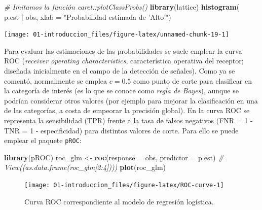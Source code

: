 \documentclass[]{book}
\newenvironment{Shaded}{\begin{snugshade}}{\end{snugshade}}
\newcommand{\KeywordTok}[1]{\textcolor[rgb]{0.13,0.29,0.53}{\textbf{#1}}}
\newcommand{\DataTypeTok}[1]{\textcolor[rgb]{0.13,0.29,0.53}{#1}}
\newcommand{\StringTok}[1]{\textcolor[rgb]{0.31,0.60,0.02}{#1}}
\newcommand{\CommentTok}[1]{\textcolor[rgb]{0.56,0.35,0.01}{\textit{#1}}}
\newcommand{\OperatorTok}[1]{\textcolor[rgb]{0.81,0.36,0.00}{\textbf{#1}}}
\newcommand{\NormalTok}[1]{#1}
\theoremstyle{break}
\theoremstyle{definition}
\theoremstyle{definition}
\theoremstyle{definition}
\theoremstyle{remark}
\begin{document}
\begin{Shaded}
\begin{Highlighting}[]
\CommentTok{# Imitamos la función caret::plotClassProbs()}
\KeywordTok{library}\NormalTok{(lattice) }
\KeywordTok{histogram}\NormalTok{(}\OperatorTok{~}\StringTok{ }\NormalTok{p.est }\OperatorTok{|}\StringTok{ }\NormalTok{obs, }\DataTypeTok{xlab =} \StringTok{"Probabilidad estimada de 'Alto'"}\NormalTok{)}
\end{Highlighting}
\end{Shaded}

\begin{center}\texttt{[image: 01-introduccion\_files/figure-latex/unnamed-chunk-19-1]} \end{center}

Para evaluar las estimaciones de las probabilidades se suele emplear la
curva ROC (\emph{receiver operating characteristics}, característica
operativa del receptor; diseñada inicialmente en el campo de la
detección de señales). Como ya se comentó, normalmente se emplea
\(c = 0.5\) como punto de corte para clasificar en la categoría de
interés (es lo que se conoce como \emph{regla de Bayes}), aunque se
podrían considerar otros valores (por ejemplo para mejorar la
clasificación en una de las categorías, a costa de empeorar la precisión
global). En la curva ROC se representa la sensibilidad (TPR) frente a la
tasa de falsos negativos (FNR = 1 - TNR = 1 - especificidad) para
distintos valores de corte. Para ello se puede emplear el paquete
\texttt{pROC}:

\begin{Shaded}
\begin{Highlighting}[]
\KeywordTok{library}\NormalTok{(pROC)}
\NormalTok{roc_glm <-}\StringTok{ }\KeywordTok{roc}\NormalTok{(}\DataTypeTok{response =}\NormalTok{ obs, }\DataTypeTok{predictor =}\NormalTok{ p.est)}
\CommentTok{# View((as.data.frame(roc_glm[2:4])))}
\KeywordTok{plot}\NormalTok{(roc_glm)}
\end{Highlighting}
\end{Shaded}

\begin{figure}[!htb]

{\centering \texttt{[image: 01-introduccion\_files/figure-latex/ROC-curve-1]} 

}

\caption{Curva ROC correspondiente al modelo de regresión logística.}\label{fig:ROC-curve}
\end{figure}
\end{document}
